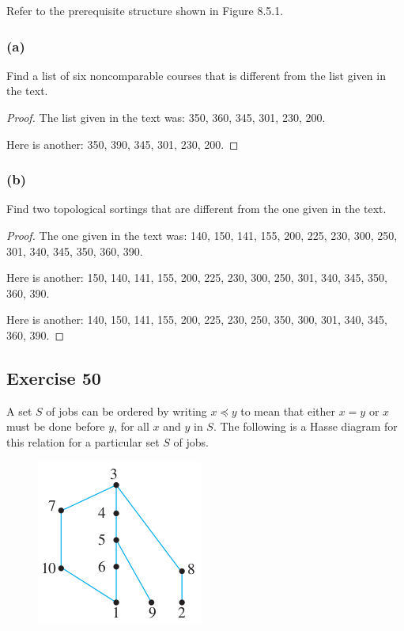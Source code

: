 \documentclass[14pt]{extarticle}
\begin{document}
Refer to the prerequisite structure shown in Figure 8.5.1.

\subsubsection{(a)}
Find a list of six noncomparable courses that is different from the list given in the text.

\begin{proof}
        The list given in the text was: 350, 360, 345, 301, 230, 200.

        Here is another: 350, 390, 345, 301, 230, 200.
\end{proof}

\subsubsection{(b)}
Find two topological sortings that are different from the one given in the text.

\begin{proof}
        The one given in the text was: 140, 150, 141, 155, 200, 225, 230, 300, 250, 301, 340, 345, 350, 360, 390.

        Here is another: 150, 140, 141, 155, 200, 225, 230, 300, 250, 301, 340, 345, 350, 360, 390.

        Here is another: 140, 150, 141, 155, 200, 225, 230, 250, 350, 300, 301, 340, 345, 360, 390.
\end{proof}

\subsection{Exercise 50}
A set $S$ of jobs can be ordered by writing \(x \preceq y\) to mean that either \(x = y\) or \(x\) must be done before
\(y\), for all \(x\) and \(y\) in \(S\). The following is a Hasse diagram for this relation for a particular set \(S\)
of jobs.

\begin{figure}[ht!]
        \centering
        \includegraphics[scale=0.5]{../images/8.5.50.png}
\end{figure}
\end{document}
